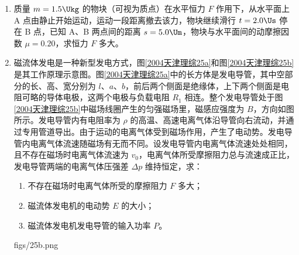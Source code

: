 \documentclass[\gkver]{gaokaozhenti}
\begin{document}
\begin{enumerate}
{由②③式得

$R = \frac{m}{qB}\sqrt{\frac{2qU}{m} + v_0^2}$ ④。

（3）粒子做圆周运动的周期为

$T = \frac{2\pi R}{v} = \frac{2\pi m}{qB}$ ⑤，

粒子在磁场中运动时间为

$t = \frac{1}{6}T$ ⑥，

由⑤⑥式得

$t = \frac{\pi m}{3qB}$ ⑦。
}

\item
质量 $m=1.5\Ukg$ 的物块（可视为质点）在水平恒力 $F$ 作用下，从水平面上 A 点由静止开始运动，运动一段距离撤去该力，物块继续滑行 $t=2.0\Us$ 停在 B 点，已知 A、B 两点间的距离 $s=5.0\Um$，物块与水平面间的动摩擦因数 $\mu=0.20$，求恒力 $F$ 多大。

\item
磁流体发电是一种新型发电方式，图\ref{2004天津理综25a}和图\ref{2004天津理综25b}是其工作原理示意图。图\ref{2004天津理综25a}中的长方体是发电导管，其中空部分的长、高、宽分别为 $l$、$a$、$b$，前后两个侧面是绝缘体，上下两个侧面是电阻可略的导体电极，这两个电极与负载电阻 $R_{1}$ 相连。整个发电导管处于图\ref{2004天津理综25b}中磁场线圈产生的匀强磁场里，磁感应强度为 $B$，方向如图所示。发电导管内有电阻率为 $\rho$ 的高温、高速电离气体沿导管向右流动，并通过专用管道导出。由于运动的电离气体受到磁场作用，产生了电动势。发电导管内电离气体流速随磁场有无而不同。设发电导管内电离气体流速处处相同，且不存在磁场时电离气体流速为 $v_{0}$，电离气体所受摩擦阻力总与流速成正比，发电导管两端的电离气体压强差 $\Delta p$ 维持恒定，求：
\begin{enumerate}
	\item
	不存在磁场时电离气体所受的摩擦阻力 $F$ 多大；
	\item
	磁流体发电机的电动势 $E$ 的大小；
	\item
	磁流体发电机发电导管的输入功率 $P$。
\end{enumerate}
{figs/25b.png}
\end{enumerate}
\end{document}
